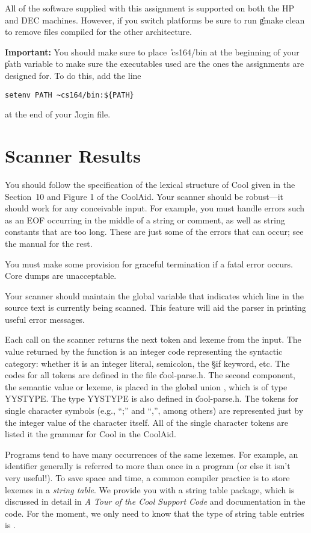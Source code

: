 All of the software supplied with this assignment is supported on both
the HP and DEC machines.  However, if you switch platforms 
be sure to run \U{gmake clean} to remove files compiled for the
other architecture.  

{\bf Important:} You should make sure to place \U{~cs164/bin} at the
beginning of your \U{path} variable to make sure the executables used
are the ones the assignments are designed for.  To do this, add the
line
\begin{verbatim}
setenv PATH ~cs164/bin:${PATH}
\end{verbatim}
at the end of your
\U{.login} file.


\section{Scanner Results}

You should follow the specification of the lexical structure of Cool
given in the Section~10 and Figure 1 of the CoolAid.  Your scanner
should be robust---it should work for any conceivable input.  For
example, you must handle errors such as an EOF occurring in the middle
of a string or comment, as well as string constants that are too long.
These are just some of the errors that can occur; see the manual for
the rest.

You must make some provision for graceful termination if a
fatal error occurs. Core dumps are unacceptable.

Your scanner should maintain the global variable 
that indicates which line in the source text is currently being scanned.
This feature will aid the parser in printing useful error messages.  

Each call on the scanner returns the next token and lexeme from the
input.  The value returned by the function  is an integer
code representing the syntactic category: whether it is an integer
literal, semicolon, the \S{if} keyword, etc.  The codes for all tokens
are defined in the file \U{cool-parse.h}.  The second component, the
semantic value or lexeme, is placed in the global union ,
which is of type YYSTYPE.  The type YYSTYPE is also defined in
\U{cool-parse.h}.  The tokens for single character symbols
 (e.g., ``;'' and ``,'', among
others) are represented just by the integer value of the character itself.
All of the single character tokens are listed it the grammar for Cool
in the CoolAid.

Programs tend to have many occurrences of the same lexemes.  For
example, an identifier generally is referred to more than once in
a program (or else it isn't very useful!).  To save space and time, a
common compiler practice is to store lexemes in a {\em string table}.
We provide you with a string table package, which is discussed in detail
in {\em A Tour of the Cool Support Code} and documentation in the code.
For the moment, we only need to know that the type of string table entries
is .

